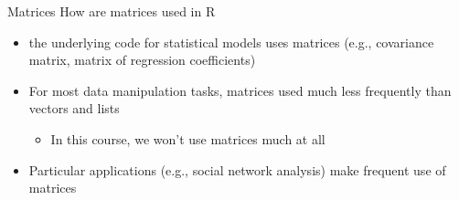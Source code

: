 \documentclass[
  8pt,
  ignorenonframetext,
  dvipsnames]{beamer}
\providecommand{\tightlist}{%
  \setlength{\itemsep}{0pt}\setlength{\parskip}{0pt}}
\let\olditem\item
\renewcommand{\item}{%
  \olditem\vspace{4pt}
}
\begin{document}
\begin{frame}{Matrices}
\protect\hypertarget{matrices-3}{}
How are matrices used in R

\begin{itemize}
\tightlist
\item
  the underlying code for statistical models uses matrices (e.g.,
  covariance matrix, matrix of regression coefficients)
\item
  For most data manipulation tasks, matrices used much less frequently
  than vectors and lists

  \begin{itemize}
  \tightlist
  \item
    In this course, we won't use matrices much at all
  \end{itemize}
\item
  Particular applications (e.g., social network analysis) make frequent
  use of matrices
\end{itemize}
\end{frame}
\end{document}
